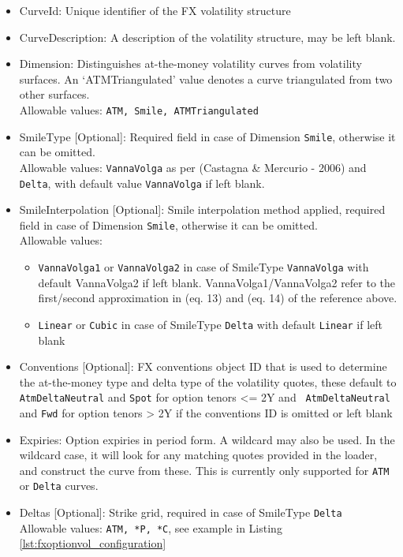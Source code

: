\documentclass[12pt, a4paper]{article}
\begin{document}
{{\begin{itemize}
\item CurveId: Unique identifier of the FX volatility structure
\item CurveDescription: A description of the volatility structure, may be left blank.
\item Dimension: Distinguishes at-the-money volatility curves from volatility surfaces. An `ATMTriangulated' value denotes a curve triangulated from two other surfaces.\\ 
Allowable values: {\tt ATM, Smile, ATMTriangulated}
\item SmileType [Optional]: Required field in case of Dimension {\tt Smile}, otherwise it can be omitted. \\
Allowable values: {\tt VannaVolga} as per (Castagna \& Mercurio - 2006) and {\tt Delta}, with default value {\tt VannaVolga} if left blank.
\item SmileInterpolation [Optional]: Smile interpolation method applied, required field in case of Dimension {\tt Smile}, otherwise it can be omitted. \\
Allowable values: 
\begin{itemize}
\item {\tt VannaVolga1} or {\tt VannaVolga2} in case of SmileType {\tt VannaVolga} with default VannaVolga2 if left blank.
VannaVolga1/VannaVolga2 refer to the first/second approximation in (eq. 13) and (eq. 14) of the reference above.
\item {\tt Linear} or {\tt Cubic} in case of SmileType {\tt Delta} with default {\tt Linear} if left blank
\end{itemize}
\item Conventions [Optional]: FX conventions object ID that is used to determine the at-the-money type and delta type of
  the volatility quotes, these default to {\tt AtmDeltaNeutral} and {\tt Spot} for option tenors <= 2Y and {\tt
    AtmDeltaNeutral} and {\tt Fwd} for option tenors > 2Y  if the conventions ID is omitted or left blank
\item Expiries: Option expiries in period form. A wildcard may also be used. In the wildcard case, it will look for any matching quotes provided in the loader, and construct the curve from these. This is currently only supported for {\tt ATM} or {\tt Delta} curves.
\item Deltas [Optional]: Strike grid, required in case of SmileType {\tt Delta} \\
Allowable values: {\tt ATM, *P, *C}, see example in Listing \ref{lst:fxoptionvol_configuration}

\end{itemize}}}
\end{document}
